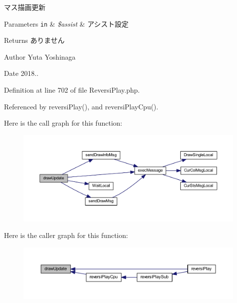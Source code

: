 マス描画更新 


\begin{DoxyParams}[1]{Parameters}
\mbox{\tt in}  & {\em \$assist} & アシスト設定 \\
\hline
\end{DoxyParams}
\begin{DoxyReturn}{Returns}
ありません 
\end{DoxyReturn}
\begin{DoxyAuthor}{Author}
Yuta Yoshinaga 
\end{DoxyAuthor}
\begin{DoxyDate}{Date}
2018.. 
\end{DoxyDate}


Definition at line 702 of file Reversi\+Play.\+php.



Referenced by reversi\+Play(), and reversi\+Play\+Cpu().

Here is the call graph for this function\+:\nopagebreak
\begin{figure}[H]
\begin{center}
\leavevmode
\includegraphics[width=350pt]{class_reversi_play_a52029e5f2e049767d1f67c3f5c18ce9f_cgraph}
\end{center}
\end{figure}
Here is the caller graph for this function\+:\nopagebreak
\begin{figure}[H]
\begin{center}
\leavevmode
\includegraphics[width=350pt]{class_reversi_play_a52029e5f2e049767d1f67c3f5c18ce9f_icgraph}
\end{center}
\end{figure}
\mbox{\label{class_reversi_play_a3ae28eb121caf59932218ea7d1fca81d}} 
